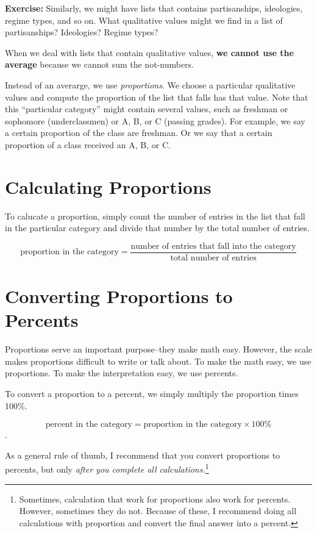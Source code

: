 \documentclass[]{book}
\let\rmarkdownfootnote\footnote%
\def\footnote{\protect\rmarkdownfootnote}
\theoremstyle{definition}
\theoremstyle{definition}
\theoremstyle{definition}
\theoremstyle{remark}
\begin{document}
\textbf{Exercise:} Similarly, we might have lists that contains
partisanships, ideologies, regime types, and so on. What qualitative
values might we find in a list of partisanships? Ideologies? Regime
types?

When we deal with lists that contain qualitative values, \textbf{we
cannot use the average} because we cannot sum the not-numbers.

Instead of an averarge, we use \emph{proportions}. We choose a
particular qualitative values and compute the proportion of the list
that falls has that value. Note that this ``particular category'' might
contain several values, such as freshman or sophomore (underclassmen) or
A, B, or C (passing grades). For example, we say a certain proportion of
the class are freshman. Or we say that a certain proportion of a class
received an A, B, or C.

\section{Calculating Proportions}\label{calculating-proportions}

To calucate a proportion, simply count the number of entries in the list
that fall in the particular category and divide that number by the total
number of entries.

\[\text{proportion in the category} = \dfrac{\text{number of entries that fall into the category}}{\text{total number of entries}}\]

\section{Converting Proportions to
Percents}\label{converting-proportions-to-percents}

Proportions serve an important purpose--they make math easy. However,
the scale makes proportions difficult to write or talk about. To make
the math easy, we use proportions. To make the interpretation easy, we
use percents.

To convert a proportion to a percent, we simply multiply the proportion
times 100\%.

\[\text{percent in the category} = \text{proportion in the category} \times 100\%\].

As a general rule of thumb, I recommend that you convert proportions to
percents, but only \emph{after you complete all calculations.}\footnote{Sometimes,
  calculation that work for proportions also work for percents. However,
  sometimes they do not. Because of these, I recommend doing all
  calculations with proportion and convert the final answer into a
  percent.}
\end{document}
